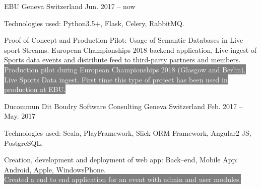 


\begin{cventries}

{EBU} %
{Geneva Switzerland} %
{Jun. 2017 – now} %
{\begin{cvitems}
\item {Technologies used: Python3.5+, Flask, Celery, RabbitMQ.}
\item {Proof of Concept and Production Pilot: Usage of Semantic Databases in Live sport Streams. European Championships 2018 backend application, Live ingest of Sports data events and distribute feed to third-party partners and members.}
\\
\center\colorbox{gray}{\textcolor{white}{Production pilot during European Championships 2018 (Glasgow and Berlin), Live Sports Data ingest. }}
\center\colorbox{gray}{\textcolor{white}{\@ First time this type of project has been used in production at EBU.}}
\end{cvitems}
}

{Ducommun Dit Boudry Software Consulting} %
{Geneva Switzerland} %
{Feb. 2017 – May. 2017} %
{\begin{cvitems}
\item {Technologies used: Scala, PlayFramework, Slick ORM Framework, Angular2 JS, PostgreSQL.}
\item {Creation, development and deployment of web app: Back–end, Mobile App: Android, Apple, WindowsPhone.}
\\
\center\colorbox{gray}{\textcolor{white}{Created a end to end application for an event with admin and user modules.}}
\end{cvitems}
}



\end{cventries}
